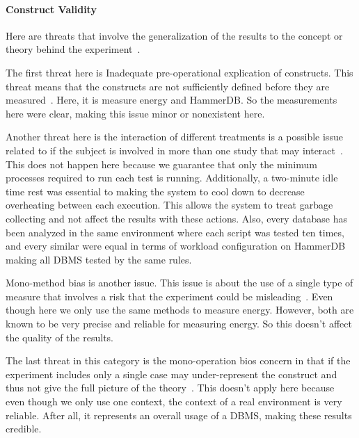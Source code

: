 \paragraph{Construct Validity}

Here are threats that involve the generalization of the results to the concept or theory behind the experiment~\cite{10.5555/2349018}.

The first threat here is Inadequate pre-operational explication of constructs. This threat means that the constructs are not sufficiently defined before they are measured~\cite{10.5555/2349018}. Here, it is measure energy and HammerDB. So the measurements here were clear, making this issue minor or nonexistent here.


Another threat here is the interaction of different treatments is a possible issue related to if the subject is involved in more than one study that may interact~\cite{10.5555/2349018}. This does not happen here because we guarantee that only the minimum processes required to run each test is running. Additionally,  a two-minute idle time rest was essential to making the system to cool down to decrease overheating between each execution. This allows the system to treat garbage collecting and not affect the results with these actions. Also, every database has been analyzed in the same environment where each script was tested ten times, and every similar were equal in terms of workload configuration on HammerDB making all DBMS tested by the same rules.


Mono-method bias is another issue. This issue is about the use of a single type of measure that involves a risk that the experiment could be misleading~\cite{10.5555/2349018}. Even though here we only use the same methods to measure energy. However, both are known to be very precise and reliable for measuring energy. So this doesn't affect the quality of the results.

The last threat in this category is the mono-operation bios concern in that if the experiment includes only a single case may under-represent the construct and thus not give the full picture of the theory~\cite{10.5555/2349018}. This doesn't apply here because even though we only use one context, the context of a real environment is very reliable. After all, it represents an overall usage of a DBMS, making these results credible.





